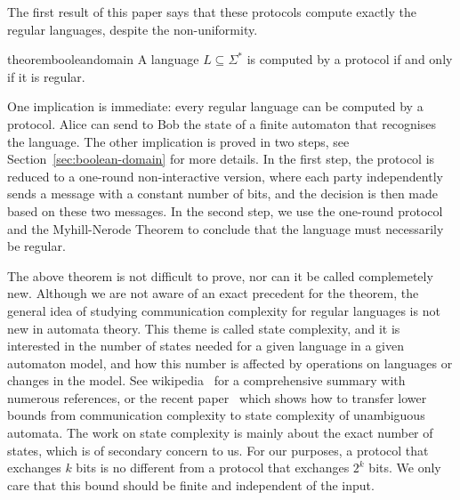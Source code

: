 The first result of this paper  says that these protocols compute exactly the regular languages, despite the non-uniformity.
\begin{restatable}{theorem}{booleandomain}
     \label{thm:boolean-domain}
  A language $L \subseteq \Sigma^*$ is computed by a protocol if and only if it is regular.
\end{restatable}
One implication is immediate: every regular language can be computed by a protocol.  Alice can send to Bob the state of a finite automaton that recognises the language. The other implication is proved in two steps, see Section~\ref{sec:boolean-domain} for more details. In the first step, the protocol is reduced to a one-round non-interactive version, where each party independently sends a message with a constant number of bits, and the decision is then made based on these two messages. In the second step, we use the one-round protocol and the Myhill-Nerode Theorem to conclude that the language must necessarily be regular. 



The above theorem is not difficult to prove, nor can it be called complemetely new.  Although we are not aware of an exact precedent for the theorem, the general idea of studying communication complexity for regular languages is not new in automata theory. This theme is called state complexity, and it is interested  in the number of states needed for a given language in a given automaton model, and how this number is affected by operations on languages or changes in the model. See  wikipedia~\cite{stateComplexityWiki} for a comprehensive summary with numerous references, or the recent paper~\cite{goosKiefer2022} which shows how to transfer lower bounds from communication complexity to state complexity of unambiguous automata. The work on state complexity is mainly about the exact number of states, which is of secondary concern to us. For our purposes, a protocol that exchanges $k$ bits is no different from a protocol that exchanges $2^k$ bits. We only care that this bound should be finite and independent of the input. 


